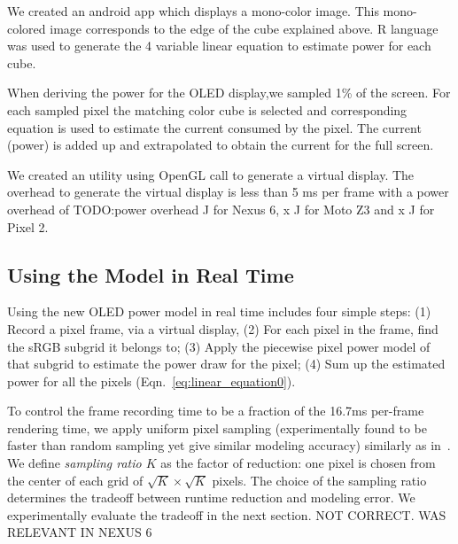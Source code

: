 We created an android app which displays a mono-color image. This mono-colored
image corresponds to the edge of the cube explained above. R language was used
to generate the 4 variable linear equation to estimate power for each cube.

When deriving the power for the OLED display,we sampled 1\%  of the screen.
For each sampled pixel the matching color cube is selected and corresponding
equation is used to estimate the current consumed by the pixel. 
The current (power) is added up and extrapolated to obtain  the current for
the full screen.

We created an utility using OpenGL call to generate a virtual display.
The overhead to generate the virtual display is less than 5 ms per frame with a
power overhead of {TODO:power overhead J for Nexus 6, x J for
Moto Z3 and x J for Pixel 2.}
\fi



\subsection{Using the Model in Real Time}
\label{subsec:appl}

Using the new OLED power model in real time includes four simple steps:
(1) Record a pixel frame, \eg via a virtual display,
(2) For each pixel in the frame, find the sRGB subgrid it belongs to;
(3) Apply the piecewise pixel power model of that subgrid to
estimate the power draw for the pixel;
(4) Sum up the estimated power for all the pixels
(Eqn.~\ref{eq:linear_equation0}).




To control the frame recording time to be a fraction of the 16.7ms
per-frame rendering time,
we apply uniform pixel sampling (experimentally found to be faster than random sampling
yet give similar modeling accuracy) similarly as
in~\cite{dong2009current}.
We define {\em sampling ratio $K$} as the factor of reduction: one pixel is chosen from
the center of each grid of
$\sqrt{K}\times\sqrt{K}$ pixels.
The choice of the sampling ratio determines the tradeoff between
runtime reduction and modeling error.
We experimentally evaluate the tradeoff in the next section. NOT CORRECT. WAS RELEVANT IN NEXUS 6
\fi

